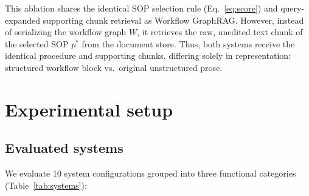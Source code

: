 \documentclass[preprint,10pt]{elsarticle}
\begin{document}
This ablation shares the identical SOP selection rule (Eq.~\eqref{eq:score}) and query-expanded supporting chunk retrieval as Workflow GraphRAG. However, instead of serializing the workflow graph $W$, it retrieves the raw, unedited text chunk of the selected SOP $p^\ast$ from the document store. Thus, both systems receive the identical procedure and supporting chunks, differing solely in representation: structured workflow block vs.\ original unstructured prose.

\section{Experimental setup}
\label{sec:setup}

\subsection{Evaluated systems}
\label{sec:systems}
We evaluate 10 system configurations grouped into three functional categories (Table~\ref{tab:systems}):
\end{document}

